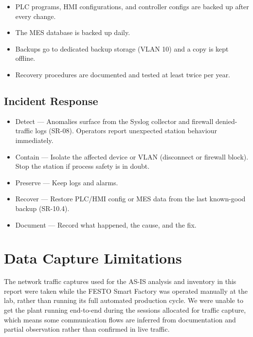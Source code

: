 \documentclass{report}
\begin{document}
\begin{itemize}
    \item PLC programs, HMI configurations, and controller configs are backed up after every change.
    \item The MES database is backed up daily.
    \item Backups go to dedicated backup storage (VLAN 10) and a copy is kept offline.
    \item Recovery procedures are documented and tested at least twice per year.
\end{itemize}

\subsection{Incident Response}
\begin{itemize}
    \item Detect — Anomalies surface from the Syslog collector and firewall denied-traffic logs (SR-08). Operators report unexpected station behaviour immediately.
    \item Contain — Isolate the affected device or VLAN (disconnect or firewall block). Stop the station if process safety is in doubt.
    \item Preserve — Keep logs and alarms.
    \item Recover — Restore PLC/HMI config or MES data from the last known-good backup (SR-10.4).
    \item Document — Record what happened, the cause, and the fix. 
\end{itemize}

\section{Data Capture Limitations}

The network traffic captures used for the AS-IS analysis and inventory in this report were taken while the FESTO Smart Factory was operated manually at the lab, rather than running its full automated production cycle. We were unable to get the plant running end-to-end during the sessions allocated for traffic capture, which means some communication flows are inferred from documentation and partial observation rather than confirmed in live traffic.
\end{document}
